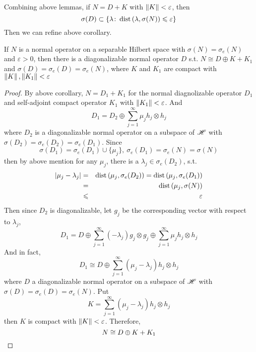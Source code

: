 \documentclass[a4paper,11pt]{report}
\begin{document}
Combining above lemmas, if $N = D + K$ with $\left\lVert K\right\lVert < \varepsilon$, then 
\begin{equation*}
	\sigma(D) \subset \{ \lambda \colon \operatorname{dist}{(\lambda,\sigma(N))} \leqslant \varepsilon\}
\end{equation*}
Then we can refine above corollary.

\begin{prop}
	If $N$ is a normal operator on a separable Hilbert space with $\sigma(N) = \sigma_e(N)$ and $\varepsilon > 0$, then there is a diagonalizable normal operator $D$ s.t. $N \cong D \oplus K + K_1 $ and $\sigma(D) = \sigma_e(D) = \sigma_e(N)$, where $K$ and $K_1$ are compact with $\left\lVert K\right\lVert, \left\lVert K_1\right\lVert < \varepsilon$
\end{prop}
\begin{proof}
	By above corollary, $N = D_1 + K_1$ for the normal diagnolizable operator $D_1$ and self-adjoint compact operator $K_1$ with $\left\lVert K_1\right\lVert < \varepsilon$. And
	\begin{equation*}
		D_1 = D_2 \oplus \sum_{j=1}^{\infty} \mu_j h_j \otimes h_j
	\end{equation*}
	where $D_2$ is a diagonalizable normal operator on a subspace of $\mathscr{H}$ with $\sigma(D_2) = \sigma_e(D_2) = \sigma_e(D_1)$. Since 
	\begin{equation*}
		\sigma(D_1) = \sigma_e(D_1) \cup \{\mu_j\},~ \sigma_e(D_1) = \sigma_e(N) = \sigma(N)
	\end{equation*}
	then by above mention for any $\mu_j$, there is a $\lambda_j \in \sigma_e(D_2)$, s.t.
	\begin{eqnarray*}
		\left\lvert\mu_j - \lambda_j\right\lvert &=& \operatorname{dist}{(\mu_j, \sigma_e(D_2))} = \operatorname{dist}{(\mu_j, \sigma_e(D_1))} \\
		&=& \operatorname{dist}{(\mu_j, \sigma(N))} \\
		&\leqslant& \varepsilon
	\end{eqnarray*}
	Then since $D_2$ is diagonalizable, let $g_j$ be the corresponding vector  with respect to $\lambda_j$,
	\begin{equation*}
		D_1 = D \oplus \sum_{j=1}^{\infty} (-\lambda_j) g_j \otimes g_j \oplus \sum_{j=1}^{\infty} \mu_j h_j \otimes h_j
	\end{equation*}
	And in fact,
	\begin{equation*}
		D_1 \cong D \oplus \sum_{j=1}^{\infty} (\mu_j-\lambda_j) h_j \otimes h_j
	\end{equation*}
	where $D$ a diagonalizable normal operator on a subspace of $\mathscr{H}$ with $\sigma(D) = \sigma_e(D) = \sigma_e(N)$. Put 
	\begin{equation*}
		K = \sum_{j=1}^{\infty} (\mu_j-\lambda_j) h_j \otimes h_j
	\end{equation*}
	then $K$ is compact with $\left\lVert K\right\lVert < \varepsilon$. Therefore,
	\begin{equation*}
		N \cong D \oplus K + K_1 \qedhere
	\end{equation*}	
\end{proof}
\end{document}
